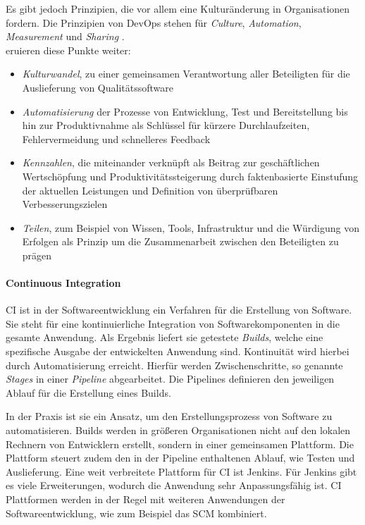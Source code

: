 Es gibt jedoch Prinzipien, die vor allem eine Kulturänderung in Organisationen fordern. Die Prinzipien von DevOps stehen für \emph{Culture}, \emph{Automation}, \emph{Measurement} und \emph{Sharing} \cite{humble:2011}. 
\medskip
\\
\citet[S.26f]{Alt2017} eruieren diese Punkte weiter:
\begin{itemize}
    \item \emph{Kulturwandel}, zu einer gemeinsamen Verantwortung aller Beteiligten für die Auslieferung von Qualitätssoftware
    \item \emph{Automatisierung} der Prozesse von Entwicklung, Test und Bereitstellung bis hin zur Produktivnahme als Schlüssel für kürzere Durchlaufzeiten, Fehlervermeidung und schnelleres Feedback
    \item \emph{Kennzahlen}, die miteinander verknüpft als Beitrag zur geschäftlichen Wertschöpfung und Produktivitätssteigerung durch faktenbasierte Einstufung der aktuellen Leistungen und Definition von überprüfbaren Verbesserungszielen
    \item \emph{Teilen}, zum Beispiel von Wissen, Tools, Infrastruktur und die Würdigung von Erfolgen als Prinzip um die Zusammenarbeit zwischen den Beteiligten zu prägen
\end{itemize}

\paragraph{Continuous Integration}
\ac{CI} ist in der Softwareentwicklung ein Verfahren für die Erstellung von Software. Sie steht für eine kontinuierliche Integration von Softwarekomponenten in die gesamte Anwendung. Als Ergebnis liefert sie getestete \emph{Builds}, welche eine spezifische Ausgabe der entwickelten Anwendung sind. Kontinuität wird hierbei durch Automatisierung erreicht. Hierfür werden Zwischenschritte, so genannte \emph{Stages} in einer \emph{Pipeline} abgearbeitet. Die Pipelines definieren den jeweiligen Ablauf für die Erstellung eines Builds.

In der Praxis ist sie ein Ansatz, um den Erstellungsprozess von Software zu automatisieren. Builds werden in größeren Organisationen nicht auf den lokalen Rechnern von Entwicklern erstellt, sondern in einer gemeinsamen Plattform. Die Plattform steuert zudem den in der Pipeline enthaltenen Ablauf, wie Testen und Auslieferung. Eine weit verbreitete Plattform für \ac{CI} ist Jenkins. Für Jenkins gibt es viele Erweiterungen, wodurch die Anwendung sehr Anpassungsfähig ist. 
\ac{CI} Plattformen werden in der Regel mit weiteren Anwendungen der Softwareentwicklung, wie zum Beispiel das \ac{SCM} kombiniert. 

